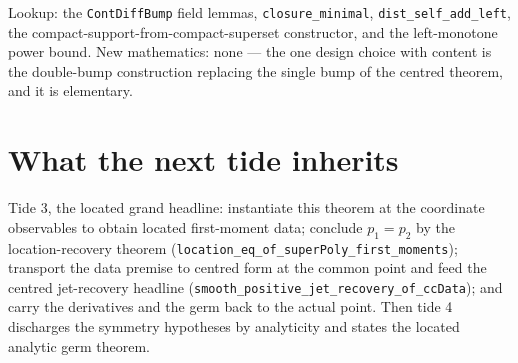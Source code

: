 \documentclass[11pt]{article}
\newcommand{\code}[1]{\texttt{#1}}
\begin{document}
Lookup: the \code{ContDiffBump} field lemmas,
\code{closure\_minimal}, \code{dist\_self\_add\_left}, the
compact-support-from-compact-superset constructor, and the
left-monotone power bound. New mathematics: none --- the one design
choice with content is the double-bump construction replacing the
single bump of the centred theorem, and it is elementary.

\section{What the next tide inherits}

Tide 3, the located grand headline: instantiate this theorem at the
coordinate observables to obtain located first-moment data; conclude
$p_1 = p_2$ by the location-recovery theorem
(\code{location\_eq\_of\_superPoly\_first\_moments});
transport the data premise to centred form at the common point and
feed the centred jet-recovery headline
(\code{smooth\_positive\_jet\_recovery\_of\_ccData});
and carry the derivatives and the germ back to the actual point.
Then tide 4 discharges the symmetry hypotheses by analyticity and
states the located analytic germ theorem.
\end{document}
